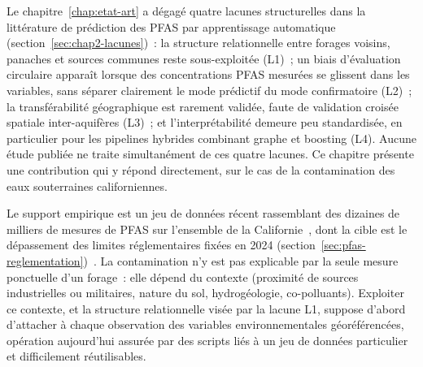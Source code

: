 \label{chap:contribution}

\label{sec:contrib-intro}

Le chapitre~\ref{chap:etat-art} a d\'egag\'e quatre lacunes structurelles dans la litt\'erature de pr\'ediction des PFAS par apprentissage automatique (section~\ref{sec:chap2-lacunes})~: la structure relationnelle entre forages voisins, panaches et sources communes reste sous-exploit\'ee (L1)~; un biais d'\'evaluation circulaire appara\^it lorsque des concentrations PFAS mesur\'ees se glissent dans les variables, sans s\'eparer clairement le mode pr\'edictif du mode confirmatoire (L2)~; la transf\'erabilit\'e g\'eographique est rarement valid\'ee, faute de validation crois\'ee spatiale inter-aquif\`eres (L3)~; et l'interpr\'etabilit\'e demeure peu standardis\'ee, en particulier pour les pipelines hybrides combinant graphe et boosting (L4). Aucune \'etude publi\'ee ne traite simultan\'ement de ces quatre lacunes. Ce chapitre pr\'esente une contribution qui y r\'epond directement, sur le cas de la contamination des eaux souterraines californiennes.

Le support empirique est un jeu de donn\'ees r\'ecent rassemblant des dizaines de milliers de mesures de PFAS sur l'ensemble de la Californie~\cite{dong2024pfas}, dont la cible est le d\'epassement des limites r\'eglementaires fix\'ees en 2024 (section~\ref{sec:pfas-reglementation})~\cite{epa2023npdwr}. La contamination n'y est pas explicable par la seule mesure ponctuelle d'un forage~: elle d\'epend du contexte (proximit\'e de sources industrielles ou militaires, nature du sol, hydrog\'eologie, co-polluants). Exploiter ce contexte, et la structure relationnelle vis\'ee par la lacune L1, suppose d'abord d'attacher \`a chaque observation des variables environnementales g\'eor\'ef\'erenc\'ees, op\'eration aujourd'hui assur\'ee par des scripts li\'es \`a un jeu de donn\'ees particulier et difficilement r\'eutilisables.

